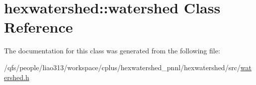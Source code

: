 \hypertarget{classhexwatershed_1_1watershed}{\section{hexwatershed\-:\-:watershed Class Reference}
\label{classhexwatershed_1_1watershed}
}


The documentation for this class was generated from the following file\-:\begin{DoxyCompactItemize}
\item 
/qfs/people/liao313/workspace/cplus/hexwatershed\-\_\-pnnl/hexwatershed/src/\hyperlink{watershed_8h}{watershed.\-h}\end{DoxyCompactItemize}
